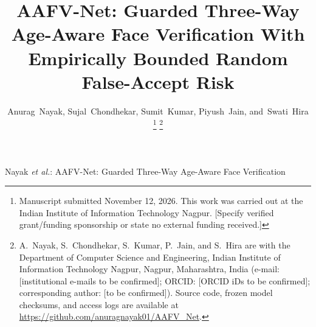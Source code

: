 \documentclass[journal]{IEEEtran}
\begin{document}
\title{AAFV-Net: Guarded Three-Way Age-Aware Face Verification With Empirically Bounded Random False-Accept Risk}

\author{Anurag~Nayak,
        Sujal~Chondhekar,
        Sumit~Kumar,
        Piyush~Jain,
        and~Swati~Hira%
\thanks{Manuscript submitted November 12, 2026. This work was carried out at the Indian Institute of Information Technology Nagpur. [Specify verified grant/funding sponsorship or state no external funding received.]}%
\thanks{A.~Nayak, S.~Chondhekar, S.~Kumar, P.~Jain, and S.~Hira are with the Department of Computer Science and Engineering, Indian Institute of Information Technology Nagpur, Nagpur, Maharashtra, India (e-mail: [institutional e-mails to be confirmed]; ORCID: [ORCID iDs to be confirmed]; corresponding author: [to be confirmed]). Source code, frozen model checksums, and access logs are available at \url{https://github.com/anuragnayak01/AAFV_Net}.}}

%
{Nayak \MakeLowercase{\textit{et al.}}: AAFV-Net: Guarded Three-Way Age-Aware Face Verification}

\maketitle
\end{document}
